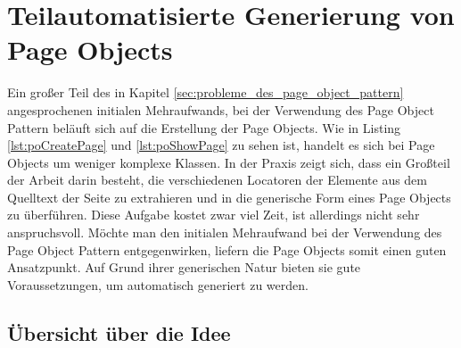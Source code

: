 
\chapter{Teilautomatisierte Generierung von Page Objects}
\label{sec:teilautomatisierte_generierung_von_pageObjects}

Ein großer Teil des in Kapitel \ref{sec:probleme_des_page_object_pattern} angesprochenen initialen Mehraufwands, bei der Verwendung des Page Object Pattern beläuft sich auf die Erstellung der Page Objects.
Wie in Listing \ref{lst:poCreatePage} und \ref{lst:poShowPage} zu sehen ist, handelt es sich bei Page Objects um weniger komplexe Klassen. In der Praxis zeigt sich, dass ein Großteil der Arbeit darin besteht, die verschiedenen Locatoren der Elemente aus dem Quelltext der Seite zu extrahieren und in die generische Form eines Page Objects zu überführen.
Diese Aufgabe kostet zwar viel Zeit, ist allerdings nicht sehr anspruchsvoll.
Möchte man den initialen Mehraufwand bei der Verwendung des Page Object Pattern entgegenwirken, liefern die Page Objects somit einen guten Ansatzpunkt.
Auf Grund ihrer generischen Natur bieten sie gute Voraussetzungen, um automatisch generiert zu werden.
\section{Übersicht über die Idee}
\label{sec:uebersicht_ueber_idee}


